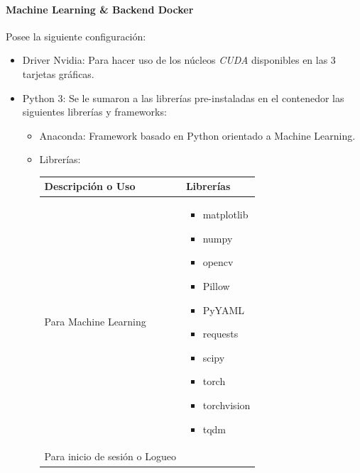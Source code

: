 \paragraph{Machine Learning \& Backend Docker}
Posee la siguiente configuración:
\begin{itemize}
    \item Driver Nvidia: Para hacer uso de los núcleos \textit{CUDA} \cite{cuda} disponibles en las 3 tarjetas gráficas.
    \item Python 3: Se le sumaron a las librerías pre-instaladas en el contenedor las siguientes librerías y frameworks:
    \begin{itemize}
        \item Anaconda: Framework basado en Python orientado a Machine Learning.
        \item Librerías:
        \begin{table}[h!]
            \centering
            \begin{tabular}{ | m{5cm} | m{4cm} |}
                \hline
                \textbf{Descripción o Uso} & \textbf{Librerías} \\
                \hline
                 Para Machine Learning      &   \begin{itemize}
                                                    \item matplotlib
                                                    \item numpy
                                                    \item opencv
                                                    \item Pillow
                                                    \item PyYAML
                                                    \item requests
                                                    \item scipy
                                                    \item torch
                                                    \item torchvision
                                                    \item tqdm
                                                \end{itemize}\\
                \hline
                Para inicio de sesión o Logueo                 &   \begin{itemize}

\end{itemize}
\end{tabular}
\end{table}
\end{itemize}
\end{itemize}
